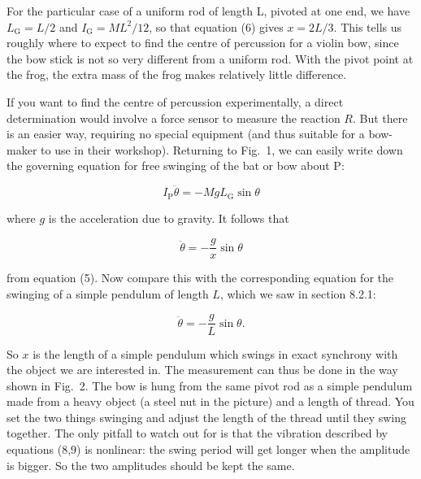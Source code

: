  For the particular case of a uniform rod of length L, pivoted at one end, we 
  have $L_{\mathrm{G}}=L/2$ and $I_{\mathrm{G}}=ML^2/12$, so that equation (6) 
  gives $x=2L/3$. This tells us roughly where to expect to find the centre of 
  percussion for a violin bow, since the bow stick is not so very different 
  from a uniform rod. With the pivot point at the frog, the extra mass of the 
  frog makes relatively little difference. 

  If you want to find the centre of percussion experimentally, a direct 
  determination would involve a force sensor to measure the reaction $R$. But 
  there is an easier way, requiring no special equipment (and thus suitable for 
  a bow-maker to use in their workshop). Returning to Fig.\ 1, we can easily 
  write down the governing equation for free swinging of the bat or bow about 
  P: 

  $$I_{\mathrm{P}} \ddot{\theta} = -MgL_{\mathrm{G}} \sin\theta \tag{7}$$ 

  where $g$ is the acceleration due to gravity. It follows that 

  $$\ddot{\theta} =-\frac{g}{x} \sin \theta \tag{8}$$ 

  from equation (5). Now compare this with the corresponding equation for the 
  swinging of a simple pendulum of length $L$, which we saw in section 8.2.1: 

  $$\ddot{\theta} =-\frac{g}{L} \sin \theta. \tag{9}$$ 

  So $x$ is the length of a simple pendulum which swings in exact synchrony 
  with the object we are interested in. The measurement can thus be done in the 
  way shown in Fig.\ 2. The bow is hung from the same pivot rod as a simple 
  pendulum made from a heavy object (a steel nut in the picture) and a length 
  of thread. You set the two things swinging and adjust the length of the 
  thread until they swing together. The only pitfall to watch out for is that 
  the vibration described by equations (8,9) is nonlinear: the swing period 
  will get longer when the amplitude is bigger. So the two amplitudes should be 
  kept the same. 

